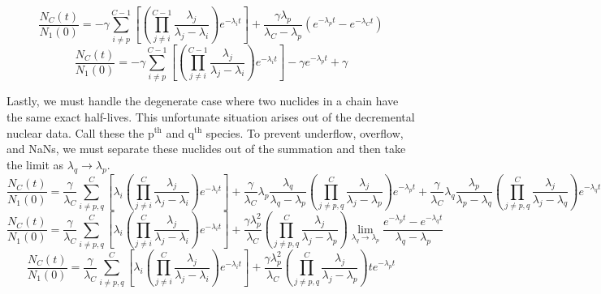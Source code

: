 \documentclass[letterpaper]{physor2018}
\newcommand{\pth}{p$^{\mathrm{th}}$\xspace}
\newcommand{\qth}{q$^{\mathrm{th}}$\xspace}
\begin{document}
\begin{equation}
\label{last-stable-and-almost-stable-3}
   \frac{N_C(t)}{N_1(0)} = -\gamma\sum_{i\ne p}^{C-1} \left[\left(\prod_{j\ne i}^{C-1} \frac{\lambda_j}{\lambda_j - \lambda_i}\right) e^{-\lambda_i t}\right]
                           + \frac{\gamma\lambda_p}{\lambda_C - \lambda_p} \left(e^{-\lambda_p t} - e^{-\lambda_C t}\right)
\end{equation}
\begin{equation}
\label{last-stable-and-almost-stable-4}
   \frac{N_C(t)}{N_1(0)} = -\gamma\sum_{i\ne p}^{C-1} \left[\left(\prod_{j\ne i}^{C-1} \frac{\lambda_j}{\lambda_j - \lambda_i}\right) e^{-\lambda_i t}\right]
                           -\gamma e^{-\lambda_p t} + \gamma
\end{equation}

Lastly, we must handle the degenerate case where two nuclides in a chain  have the same exact half-lives.
This unfortunate situation arises out of the decremental nuclear data. Call these the \pth and \qth
species. To prevent underflow, overflow, and NaNs, we must separate these nuclides out of the summation
and then take the limit as $\lambda_q \to \lambda_p$.
\begin{equation}
\label{pq-same-0}
   \frac{N_C(t)}{N_1(0)} = \frac{\gamma}{\lambda_C}\sum_{i\ne p,q}^{C} \left[\lambda_i \left(\prod_{j\ne i}^{C} \frac{\lambda_j}{\lambda_j - \lambda_i}\right) e^{-\lambda_i t}\right]
                           + \frac{\gamma}{\lambda_C} \lambda_p \frac{\lambda_q}{\lambda_q - \lambda_p} \left(\prod_{j\ne p,q}^{C} \frac{\lambda_j}{\lambda_j - \lambda_p} \right) e^{-\lambda_p t}
                           + \frac{\gamma}{\lambda_C} \lambda_q \frac{\lambda_p}{\lambda_p - \lambda_q} \left(\prod_{j\ne p,q}^{C} \frac{\lambda_j}{\lambda_j - \lambda_q} \right) e^{-\lambda_q t}
\end{equation}
\begin{equation}
\label{pq-same-1}
   \frac{N_C(t)}{N_1(0)} = \frac{\gamma}{\lambda_C}\sum_{i\ne p,q}^{C} \left[\lambda_i \left(\prod_{j\ne i}^{C} \frac{\lambda_j}{\lambda_j - \lambda_i}\right) e^{-\lambda_i t}\right]
                           + \frac{\gamma\lambda_p^2}{\lambda_C} \left(\prod_{j\ne p,q}^{C} \frac{\lambda_j}{\lambda_j - \lambda_p} \right)
                             \lim_{\lambda_q\to\lambda_p}\frac{e^{-\lambda_p t} - e^{-\lambda_q t}}{\lambda_q - \lambda_p}
\end{equation}
\begin{equation}
\label{pq-same-2}
   \frac{N_C(t)}{N_1(0)} = \frac{\gamma}{\lambda_C}\sum_{i\ne p,q}^{C} \left[\lambda_i \left(\prod_{j\ne i}^{C} \frac{\lambda_j}{\lambda_j - \lambda_i}\right) e^{-\lambda_i t}\right]
                           + \frac{\gamma\lambda_p^2}{\lambda_C} \left(\prod_{j\ne p,q}^{C} \frac{\lambda_j}{\lambda_j - \lambda_p} \right) t e^{-\lambda_p t}
\end{equation}
\end{document}
